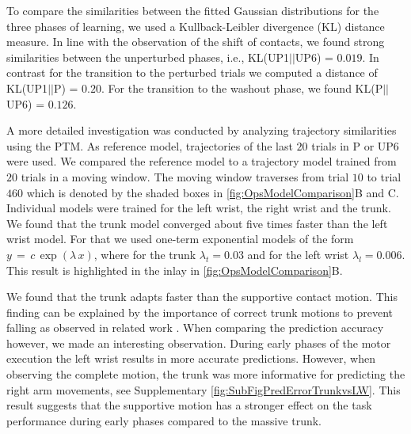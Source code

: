 To compare the similarities between the fitted Gaussian distributions for the three phases of 
learning, we used a Kullback-Leibler divergence (KL) distance measure. 
In line with the observation of the shift of contacts, we 
found strong similarities between the unperturbed phases, i.e., KL(UP1$||$UP6) = 
$0.019$. In contrast for the transition to the perturbed trials we computed 
a distance of KL(UP1$||$P) = $0.20$. For the transition to the washout phase, 
we found KL(P$||$UP6) = $0.126$. 


A more detailed investigation was conducted by analyzing trajectory  
similarities using the PTM. As reference model, trajectories of the last $20$ 
trials in P or UP6 were used. We compared the reference model to a trajectory 
model trained from $20$ trials in a moving window. The moving window traverses from trial 
$10$ to trial $460$ which is denoted by the shaded boxes in \FigureAbbrP 
\ref{fig:OpsModelComparison}B and C. 
Individual models were trained for the left wrist, the right wrist and the 
trunk. We found that the trunk model converged about five times faster than the 
left wrist model. For that we used one-term exponential models of the form 
$y\,=\,c\,\exp(\lambda\,x)$, where for the trunk $\lambda_t=0.03$ and for the left wrist $\lambda_l=0.006$. 
This result is highlighted in the inlay in \FigureAbbr \ref{fig:OpsModelComparison}B.
% 
% 

We found that the trunk adapts faster than the supportive contact motion. This 
finding can be explained by the importance of correct trunk motions to prevent 
falling as observed in related work \cite{bouisset1981sequence, stapley1999does}. When comparing the prediction accuracy however, we made an interesting 
observation. During early phases of the motor execution the left wrist results 
in more accurate predictions. However, when observing the complete motion, the 
trunk was more informative for predicting the right arm movements, see 
Supplementary \FigureAbbr \ref{fig:SubFigPredErrorTrunkvsLW}. This result 
suggests that the supportive motion has a stronger effect on the task 
performance during early phases compared to the massive trunk. 

